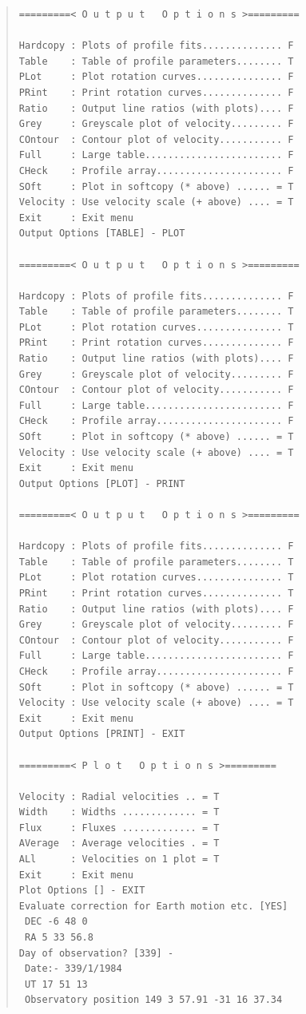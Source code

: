 \begin{quote}\begin{verbatim}
=========< O u t p u t   O p t i o n s >=========
 
Hardcopy : Plots of profile fits.............. F
Table    : Table of profile parameters........ T
PLot     : Plot rotation curves............... F
PRint    : Print rotation curves.............. F
Ratio    : Output line ratios (with plots).... F
Grey     : Greyscale plot of velocity......... F
COntour  : Contour plot of velocity........... F
Full     : Large table........................ F
CHeck    : Profile array...................... F
SOft     : Plot in softcopy (* above) ...... = T
Velocity : Use velocity scale (+ above) .... = T
Exit     : Exit menu
Output Options [TABLE] - PLOT
 
=========< O u t p u t   O p t i o n s >=========
 
Hardcopy : Plots of profile fits.............. F
Table    : Table of profile parameters........ T
PLot     : Plot rotation curves............... T
PRint    : Print rotation curves.............. F
Ratio    : Output line ratios (with plots).... F
Grey     : Greyscale plot of velocity......... F
COntour  : Contour plot of velocity........... F
Full     : Large table........................ F
CHeck    : Profile array...................... F
SOft     : Plot in softcopy (* above) ...... = T
Velocity : Use velocity scale (+ above) .... = T
Exit     : Exit menu
Output Options [PLOT] - PRINT
 
=========< O u t p u t   O p t i o n s >=========
 
Hardcopy : Plots of profile fits.............. F
Table    : Table of profile parameters........ T
PLot     : Plot rotation curves............... T
PRint    : Print rotation curves.............. T
Ratio    : Output line ratios (with plots).... F
Grey     : Greyscale plot of velocity......... F
COntour  : Contour plot of velocity........... F
Full     : Large table........................ F
CHeck    : Profile array...................... F
SOft     : Plot in softcopy (* above) ...... = T
Velocity : Use velocity scale (+ above) .... = T
Exit     : Exit menu
Output Options [PRINT] - EXIT

=========< P l o t   O p t i o n s >=========

Velocity : Radial velocities .. = T
Width    : Widths ............. = T
Flux     : Fluxes ............. = T
AVerage  : Average velocities . = T
ALl      : Velocities on 1 plot = T
Exit     : Exit menu
Plot Options [] - EXIT
Evaluate correction for Earth motion etc. [YES]
 DEC -6 48 0
 RA 5 33 56.8
Day of observation? [339] -
 Date:- 339/1/1984
 UT 17 51 13
 Observatory position 149 3 57.91 -31 16 37.34
\end{verbatim}\end{quote}

